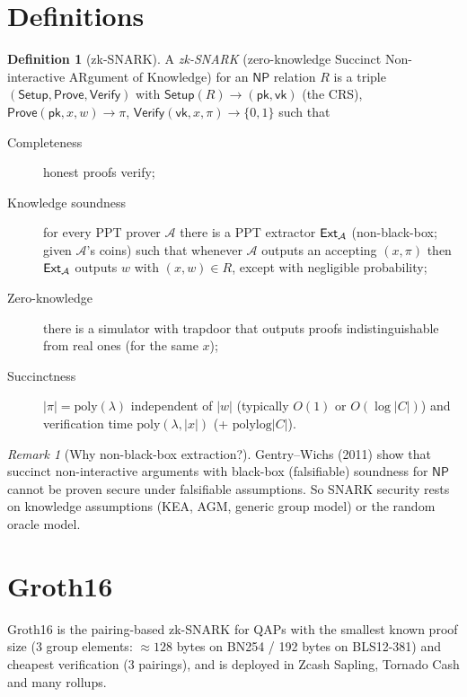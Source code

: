 \documentclass[11pt,a4paper]{report}
\theoremstyle{plain}
\theoremstyle{definition}
\newtheorem{definition}[theorem]{Definition}
\theoremstyle{remark}
\newtheorem{remark}[theorem]{Remark}
\newcommand{\poly}{\mathrm{poly}}
\newcommand{\polylog}{\mathrm{polylog}}
\newcommand{\NP}{\mathsf{NP}}\newcommand{\BPP}{\mathsf{BPP}}\newcommand{\IP}{\mathsf{IP}}
\begin{document}
\section{Definitions}
\begin{definition}[zk-SNARK]\label{def:snark}
A \emph{zk-SNARK} (zero-knowledge Succinct Non-interactive ARgument of Knowledge) for an $\NP$ relation $R$ is a triple $(\mathsf{Setup},\mathsf{Prove},\mathsf{Verify})$ with $\mathsf{Setup}(R)\to(\mathsf{pk},\mathsf{vk})$ (the CRS), $\mathsf{Prove}(\mathsf{pk},x,w)\to\pi$, $\mathsf{Verify}(\mathsf{vk},x,\pi)\to\{0,1\}$ such that
\begin{description}
\item[Completeness] honest proofs verify;
\item[Knowledge soundness] for every PPT prover $\mathcal A$ there is a PPT extractor $\mathsf{Ext}_{\mathcal A}$ (non-black-box; given $\mathcal A$'s coins) such that whenever $\mathcal A$ outputs an accepting $(x,\pi)$ then $\mathsf{Ext}_{\mathcal A}$ outputs $w$ with $(x,w)\in R$, except with negligible probability;
\item[Zero-knowledge] there is a simulator with trapdoor that outputs proofs indistinguishable from real ones (for the same $x$);
\item[Succinctness] $|\pi|=\poly(\lambda)$ independent of $|w|$ (typically $O(1)$ or $O(\log|C|)$) and verification time $\poly(\lambda,|x|)$ (+ $\polylog|C|$).
\end{description}
\end{definition}
\begin{remark}[Why non-black-box extraction?]
Gentry--Wichs (2011) show that succinct non-interactive arguments with black-box (falsifiable) soundness for $\NP$ cannot be proven secure under falsifiable assumptions. So SNARK security rests on knowledge assumptions (KEA, AGM, generic group model) or the random oracle model.
\end{remark}

\section{Groth16}
Groth16 \cite{Gro16} is the pairing-based zk-SNARK for QAPs with the smallest known proof size (3 group elements: $\approx128$ bytes on BN254 / 192 bytes on BLS12-381) and cheapest verification (3 pairings), and is deployed in Zcash Sapling, Tornado Cash and many rollups.
\end{document}
